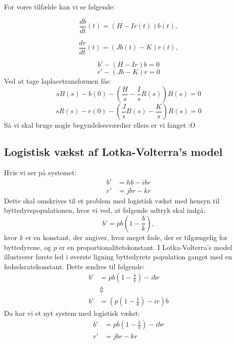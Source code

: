 For vores tilfælde kan vi se følgende:

\begin{equation*}
    \dfrac{db}{dt}(t) = (H-Ir(t)) b(t), 
\end{equation*}

\begin{equation*}
    \dfrac{dr}{dt}(t) = (Jb(t)-K) r(t),
\end{equation*}

$$b' - (H - Ir)b = 0 $$
$$r' - (Jb - K)r = 0 $$
Ved at tage laplacetransformen fås:
$$sB(s) - b(0) - (\frac{H}{s} - \frac{I}{s}R(s))B(s) = 0$$
$$sR(s) - r(0) - (\frac{J}{s}B(s) - \frac{K}{s})R(s) = 0$$
Så vi skal bruge nogle begyndelsesværdier ellers er vi fanget :O

\subsection{Logistisk vækst af Lotka-Volterra's model}

Hvis vi ser på systemet:
\begin{align*}
    b' &= hb - ibr\\
    r' &= jbr - kr
\end{align*}
Dette skal omskrives til et problem med logistisk vækst med hensyn til byttedyrspopulationen, hvor vi ved, at følgende udtryk skal indgå:
$$b' = pb(1 -  \frac{b}{k}),$$
hvor $k$ er en konstant, der angiver, hvor meget føde, der er tilgængelig for byttedyrene, og $p$ er en proportionalitetskonstant.
\hfill \break
I Lotka-Volterra's model illustrerer første led i øverste ligning byttedyrets population ganget med en fødselsratekonstant. Dette ændres til følgende:
\begin{align*}
    b' & = pb(1 -  \frac{b}{k}) - ibr\\
    &\Updownarrow\\
    b' &= (p(1 - \frac{b}{k}) - ir)b
\end{align*}
Da har vi et nyt system med logistisk vækst:
\begin{align*}
    b' &= pb(1 - \frac{b}{k}) - ibr\\
    r' &= jbr - kr
\end{align*}


